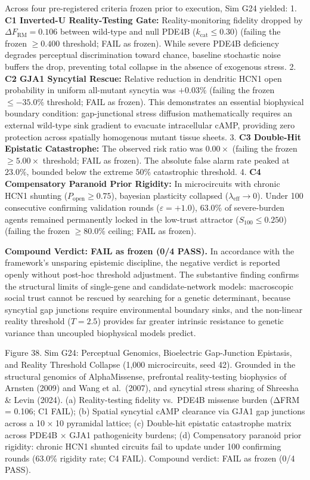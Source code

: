 \documentclass[
]{article}
\begin{document}
Across four pre-registered criteria frozen prior to execution, Sim G24
yielded: 1. \textbf{C1 Inverted-U Reality-Testing Gate:}
Reality-monitoring fidelity dropped by \(\Delta F_{\text{RM}} = 0.106\)
between wild-type and null PDE4B (\(k_{\text{cat}} \le 0.30\)) (failing
the frozen \(\ge 0.400\) threshold; FAIL as frozen). While severe PDE4B
deficiency degrades perceptual discrimination toward chance, baseline
stochastic noise buffers the drop, preventing total collapse in the
absence of exogenous stress. 2. \textbf{C2 GJA1 Syncytial Rescue:}
Relative reduction in dendritic HCN1 open probability in uniform
all-mutant syncytia was \(+0.03\%\) (failing the frozen \(\le -35.0\%\)
threshold; FAIL as frozen). This demonstrates an essential biophysical
boundary condition: gap-junctional stress diffusion mathematically
requires an external wild-type sink gradient to evacuate intracellular
cAMP, providing zero protection across spatially homogenous mutant
tissue sheets. 3. \textbf{C3 Double-Hit Epistatic Catastrophe:} The
observed risk ratio was \(0.00\times\) (failing the frozen
\(\ge 5.00\times\) threshold; FAIL as frozen). The absolute false alarm
rate peaked at \(23.0\%\), bounded below the extreme \(50\%\)
catastrophic threshold. 4. \textbf{C4 Compensatory Paranoid Prior
Rigidity:} In microcircuits with chronic HCN1 shunting
(\(P_{\text{open}} \ge 0.75\)), bayesian plasticity collapsed
(\(\lambda_{\text{eff}} \to 0\)). Under 100 consecutive confirming
validation rounds (\(\varepsilon = +1.0\)), \(63.0\%\) of severe-burden
agents remained permanently locked in the low-trust attractor
(\(S_{100} \le 0.250\)) (failing the frozen \(\ge 80.0\%\) ceiling; FAIL
as frozen).

\textbf{Compound Verdict: FAIL as frozen (0/4 PASS).} In accordance with
the framework's unsparing epistemic discipline, the negative verdict is
reported openly without post-hoc threshold adjustment. The substantive
finding confirms the structural limits of single-gene and
candidate-network models: macroscopic social trust cannot be rescued by
searching for a genetic determinant, because syncytial gap junctions
require environmental boundary sinks, and the non-linear reality
threshold (\(T = 2.5\)) provides far greater intrinsic resistance to
genetic variance than uncoupled biophysical models predict.

Figure 38. Sim G24: Perceptual Genomics, Bioelectric Gap-Junction
Epistasis, and Reality Threshold Collapse (1,000 microcircuits, seed
42). Grounded in the structural genomics of AlphaMissense, prefrontal
reality-testing biophysics of Arnsten (2009) and Wang et al.~(2007), and
syncytial stress sharing of Shreesha \& Levin (2024). (a)
Reality-testing fidelity vs.~PDE4B missense burden ({ΔFRM = 0.106}; C1
FAIL); (b) Spatial syncytial cAMP clearance via GJA1 gap junctions
across a {10 × 10} pyramidal lattice; (c) Double-hit epistatic
catastrophe matrix across PDE4B {×} GJA1 pathogenicity burdens; (d)
Compensatory paranoid prior rigidity: chronic HCN1 shunted circuits fail
to update under 100 confirming rounds (63.0\% rigidity rate; C4 FAIL).
Compound verdict: FAIL as frozen (0/4 PASS).
\end{document}

